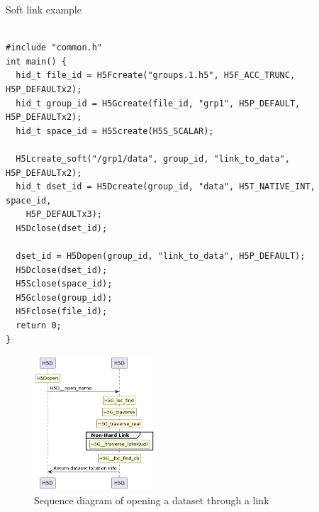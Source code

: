 \begin{listing}
\centering
\caption{Soft link example}
\label{lst:soft-link-example}
\begin{verbatim}

#include "common.h"
int main() {
  hid_t file_id = H5Fcreate("groups.1.h5", H5F_ACC_TRUNC, H5P_DEFAULTx2);
  hid_t group_id = H5Gcreate(file_id, "grp1", H5P_DEFAULT, H5P_DEFAULTx2);
  hid_t space_id = H5Screate(H5S_SCALAR);

  H5Lcreate_soft("/grp1/data", group_id, "link_to_data", H5P_DEFAULTx2);
  hid_t dset_id = H5Dcreate(group_id, "data", H5T_NATIVE_INT, space_id, 
    H5P_DEFAULTx3);
  H5Dclose(dset_id);

  dset_id = H5Dopen(group_id, "link_to_data", H5P_DEFAULT);
  H5Dclose(dset_id);
  H5Sclose(space_id);
  H5Gclose(group_id);
  H5Fclose(file_id);
  return 0;
}

\end{verbatim}
\end{listing}

\begin{figure}
    \centering
    \includegraphics[width=0.40\textwidth]{images/tour_4_uml_link_access.png}
    \caption{Sequence diagram of opening a dataset through a link}
    \label{fig:tour-4-uml-link-access}
\end{figure}

